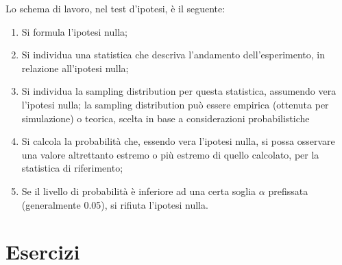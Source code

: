 \documentclass[a4paper,12pt,oneside]{book}
\providecommand{\tightlist}{%
  \setlength{\itemsep}{0pt}\setlength{\parskip}{0pt}}
\begin{document}
Lo schema di lavoro, nel test d'ipotesi, è il seguente:

\begin{enumerate}
\def\labelenumi{\arabic{enumi}.}
\tightlist
\item
  Si formula l'ipotesi nulla;
\item
  Si individua una statistica che descriva l'andamento dell'esperimento, in relazione all'ipotesi nulla;
\item
  Si individua la sampling distribution per questa statistica, assumendo vera l'ipotesi nulla; la sampling distribution può essere empirica (ottenuta per simulazione) o teorica, scelta in base a considerazioni probabilistiche
\item
  Si calcola la probabilità che, essendo vera l'ipotesi nulla, si possa osservare una valore altrettanto estremo o più estremo di quello calcolato, per la statistica di riferimento;
\item
  Se il livello di probabilità è inferiore ad una certa soglia \(\alpha\) prefissata (generalmente 0.05), si rifiuta l'ipotesi nulla.
\end{enumerate}

\hypertarget{esercizi-1}{%
\section{Esercizi}\label{esercizi-1}}
\end{document}
